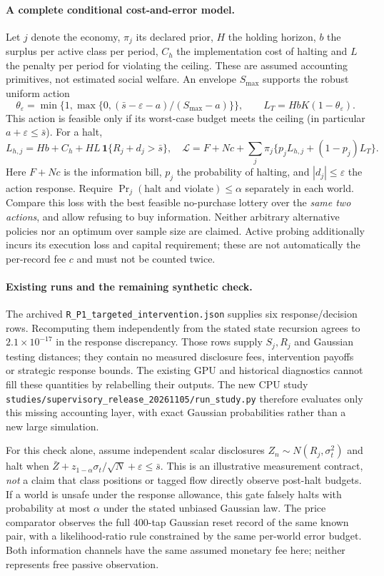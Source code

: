 \documentclass[12pt]{article}
\theoremstyle{definition}
\theoremstyle{remark}
\begin{document}
\paragraph{A complete conditional cost-and-error model.} Let $j$ denote the economy, $\pi_j$ its declared prior, $H$ the holding horizon, $b$ the surplus per active class per period, $C_h$ the implementation cost of halting and $L$ the penalty per period for violating the ceiling. These are assumed accounting primitives, not estimated social welfare. An envelope $S_{\max}$ supports the robust uniform action
\[
\theta_\varepsilon=\min\{1,\max\{0,(\bar s-\varepsilon-a)/(S_{\max}-a)\}\},\qquad
 L_T=HbK(1-\theta_\varepsilon).
\]
This action is feasible only if its worst-case budget meets the ceiling (in particular $a+\varepsilon\le\bar s$). For a halt,
\[
 L_{h,j}=Hb+C_h+HL\,\mathbf1\{R_j+d_j>\bar s\},\quad
 \mathcal L=F+Nc+\sum_j\pi_j\{p_jL_{h,j}+(1-p_j)L_T\}.
\]
Here $F+Nc$ is the information bill, $p_j$ the probability of halting, and $|d_j|\le\varepsilon$ the action response. Require $\Pr_j(\text{halt and violate})\le\alpha$ separately in each world. Compare this loss with the best feasible no-purchase lottery over the \emph{same two actions}, and allow refusing to buy information. Neither arbitrary alternative policies nor an optimum over sample size are claimed. Active probing additionally incurs its execution loss and capital requirement; these are not automatically the per-record fee $c$ and must not be counted twice.

\paragraph{Existing runs and the remaining synthetic check.} The archived \nolinkurl{R_P1_targeted_intervention.json} supplies six response/decision rows. Recomputing them independently from the stated state recursion agrees to $2.1\times10^{-17}$ in the response discrepancy. Those rows supply $S_j,R_j$ and Gaussian testing distances; they contain no measured disclosure fees, intervention payoffs or strategic response bounds. The existing GPU and historical diagnostics cannot fill these quantities by relabelling their outputs. The new CPU study \nolinkurl{studies/supervisory_release_20261105/run_study.py} therefore evaluates only this missing accounting layer, with exact Gaussian probabilities rather than a new large simulation.

For this check alone, assume independent scalar disclosures $Z_n\sim N(R_j,\sigma_t^2)$ and halt when $\bar Z+z_{1-\alpha}\sigma_t/\sqrt N+\varepsilon\le\bar s$. This is an illustrative measurement contract, \emph{not} a claim that class positions or tagged flow directly observe post-halt budgets. If a world is unsafe under the response allowance, this gate falsely halts with probability at most $\alpha$ under the stated unbiased Gaussian law. The price comparator observes the full 400-tap Gaussian reset record of the same known pair, with a likelihood-ratio rule constrained by the same per-world error budget. Both information channels have the same assumed monetary fee here; neither represents free passive observation.
\end{document}
